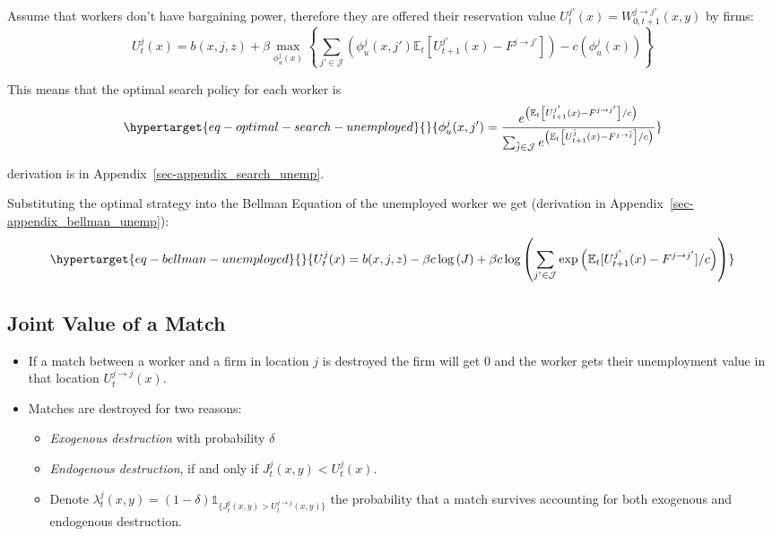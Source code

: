 \documentclass[
  letterpaper,
  DIV=11,
  numbers=noendperiod]{scrreprt}
\providecommand{\tightlist}{%
  \setlength{\itemsep}{0pt}\setlength{\parskip}{0pt}}\usepackage{longtable,booktabs,array}
\begin{document}
Assume that workers don't have bargaining power, therefore they are
offered their reservation value
\(U^{j'}_t(x)=W^{j\to j'}_{0, t+1}(x,y)\) by firms:
\[U^{j}_{t}(x) = b(x, j, z) + \beta \max_{\phi^j_u(x)} \left\{\sum_{j'\in \mathcal{J}} \left(\phi^j_u(x, j')\mathbb{E}_t\left[U^{j'}_{t+1}(x) - F^{j \to j'}\right]\right) -c(\phi^j_u(x)) \right\} \]

This means that the optimal search policy for each worker is
\begin{equation}\protect\hypertarget{eq-optimal-search-unemployed}{}{ \phi^j_u(x,j') = \frac{e^{\left(\mathbb{E}_t\left[U^{j'}_{t+1}(x) - F^{j \to j'}\right] /c\right)}}{\sum_{\tilde{j}\in \mathcal{J}}e^{\left(\mathbb{E}_t\left[U^{\tilde{j}}_{t+1}(x) - F^{j \to \tilde{j}}\right] /c\right)}}}\label{eq-optimal-search-unemployed}\end{equation}

derivation is in Appendix~\ref{sec-appendix_search_unemp}.

Substituting the optimal strategy into the Bellman Equation of the
unemployed worker we get (derivation in
Appendix~\ref{sec-appendix_bellman_unemp}):
\begin{equation}\protect\hypertarget{eq-bellman-unemployed}{}{U^{j}_{t}(x) = b(x, j, z) -\beta c \log{(J)} + \beta c \log{\left( \sum_{j' \in \mathcal{J}}\exp{\left(\mathbb{E}_t[U_{t+1}^{j'}(x) - F^{j \to j'}]/c\right)}\right)}}\label{eq-bellman-unemployed}\end{equation}

\hypertarget{joint-value-of-a-match}{%
\subsection{Joint Value of a Match}\label{joint-value-of-a-match}}

\begin{itemize}
\tightlist
\item
  If a match between a worker and a firm in location \(j\) is destroyed
  the firm will get \(0\) and the worker gets their unemployment value
  in that location \(U^{j\to j}_t(x)\).
\item
  Matches are destroyed for two reasons:

  \begin{itemize}
  \tightlist
  \item
    \emph{Exogenous destruction} with probability \(\delta\)
  \item
    \emph{Endogenous destruction}, if and only if
    \(J^j_t(x,y) < U^j_t(x)\).
  \item
    Denote
    \(\lambda^j_{t}(x,y) = (1-\delta)\mathbb{1}_{\{J^j_{t}(x,y)>U^{j\to j}_{t}(x,y)\}}\)
    the probability that a match survives accounting for both exogenous
    and endogenous destruction.
  \end{itemize}
\end{itemize}
\end{document}
